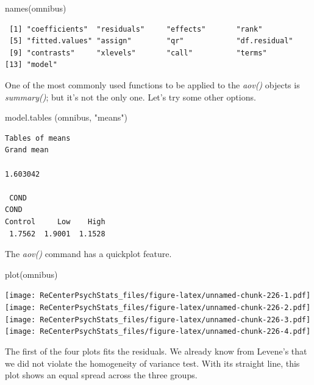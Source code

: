 \documentclass[
  11pt,
]{book}
\newenvironment{Shaded}{\begin{snugshade}}{\end{snugshade}}
\newcommand{\FunctionTok}[1]{\textcolor[rgb]{0.00,0.00,0.00}{#1}}
\newcommand{\NormalTok}[1]{#1}
\newcommand{\StringTok}[1]{\textcolor[rgb]{0.31,0.60,0.02}{#1}}
\begin{document}
\begin{Shaded}
\begin{Highlighting}[]
\FunctionTok{names}\NormalTok{(omnibus)}
\end{Highlighting}
\end{Shaded}

\begin{verbatim}
 [1] "coefficients"  "residuals"     "effects"       "rank"         
 [5] "fitted.values" "assign"        "qr"            "df.residual"  
 [9] "contrasts"     "xlevels"       "call"          "terms"        
[13] "model"        
\end{verbatim}

One of the most commonly used functions to be applied to the \emph{aov()} objects is \emph{summary()}; but it's not the only one. Let's try some other options.

\begin{Shaded}
\begin{Highlighting}[]
\FunctionTok{model.tables}\NormalTok{ (omnibus, }\StringTok{"means"}\NormalTok{)}
\end{Highlighting}
\end{Shaded}

\begin{verbatim}
Tables of means
Grand mean
         
1.603042 

 COND 
COND
Control     Low    High 
 1.7562  1.9001  1.1528 
\end{verbatim}

The \emph{aov()} command has a quickplot feature.

\begin{Shaded}
\begin{Highlighting}[]
\FunctionTok{plot}\NormalTok{(omnibus) }
\end{Highlighting}
\end{Shaded}

\texttt{[image: ReCenterPsychStats\_files/figure-latex/unnamed-chunk-226-1.pdf]} \texttt{[image: ReCenterPsychStats\_files/figure-latex/unnamed-chunk-226-2.pdf]} \texttt{[image: ReCenterPsychStats\_files/figure-latex/unnamed-chunk-226-3.pdf]} \texttt{[image: ReCenterPsychStats\_files/figure-latex/unnamed-chunk-226-4.pdf]}

The first of the four plots fits the residuals. We already know from Levene's that we did not violate the homogeneity of variance test. With its straight line, this plot shows an equal spread across the three groups.
\end{document}
